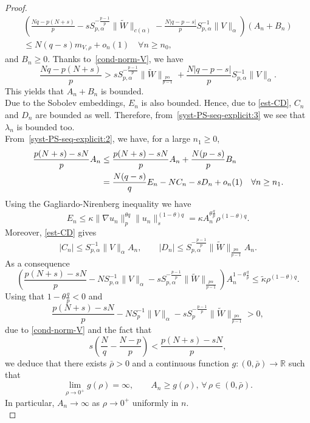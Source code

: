\documentclass[11pt,reqno]{amsart}
\theoremstyle{definition}
\numberwithin{equation}{section}
\numberwithin{theorem}{section}
\numberwithin{equation}{section}
\numberwithin{theorem}{section}
\newcommand{\R}{\mathbb{R}}
\begin{document}
\begin{proof}
\begin{align*}
    \left(\frac{Nq-p(N+s)}{p} -sS_{p,\alpha}^{-\frac{p-1}{p}}\|\tilde{W}\|_{c(\alpha)} 
    - \frac{N|q-p-s|}{p} S_{p,\alpha}^{-1}\|V\|_{\alpha} 
    \right)(A_n+B_n)\\
    \le 
      N(q-s)m_{V,\rho}+o_n(1)\quad\forall n\ge n_0,
\end{align*}
and $B_n\ge 0$.
Thanks to~\eqref{cond-norm-V}, we have
\[
\frac{Nq-p(N+s)}{p} > sS_{p,\alpha}^{-\frac{p-1}{p}}\|\tilde{W}\|_{\frac{p\alpha}{p-1}} 
    + \frac{N|q-p-s|}{p} S_{p,\alpha}^{-1}\|V\|_{\alpha}.
\]
This yields that $A_n+B_n$ is bounded.\\
Due to the Sobolev embeddings, $E_n$ is also bounded. Hence, due to \eqref{est-CD}, $C_n$ and $D_n$ are bounded as well. 
Therefore, from~\eqref{syst-PS-seq-explicit:3} we see that $\lambda_n$ is bounded too.\\

From~\eqref{syst-PS-seq-explicit:2}, we have, for a large $n_1\ge 0$,
\begin{equation}\notag
\begin{aligned}
\frac{p(N+s)-sN}{p}A_n
&\le\frac{p(N+s)-sN}{p}A_n+\frac{N(p-s)}{p}B_n\\
&=\frac{N(q-s)}{q}E_n-NC_n-sD_n+o_n(1)\quad\forall n\ge n_1.
\end{aligned}    
\end{equation}
Using the Gagliardo-Nirenberg inequality we have
$$E_n\le \kappa\|\nabla u_n\|_p^{\theta q}\|u_n\|_s^{(1-\theta)q}=\kappa A_n^{\theta\frac{q}{p}}\rho^{(1-\theta)q}.$$
Moreover, \eqref{est-CD} gives
$$|C_n|\le S_{p,\alpha}^{-1}\|V\|_{\alpha}A_n,\qquad |D_n|\le S_{p,\alpha}^{-\frac{p-1}{p}}\|\tilde{W}\|_{\frac{p\alpha}{p-1}}A_n.$$
As a consequence
$$\left(\frac{p(N+s)-sN}{p}-NS_{p,\alpha}^{-1}\|V\|_{\alpha}-sS_{p,\alpha}^{-\frac{p-1}{p}}\|\tilde{W}\|_{\frac{p\alpha}{p-1}}\right)A_n^{1-\theta\frac{q}{p}}
\le\tilde{\kappa}\rho^{(1-\theta)q}.$$
Using that $1-\theta\frac{q}{p}<0$ and
\begin{equation}
\label{extra-cond-V1}
\frac{p(N+s)-sN}{p}-N S_p^{-1}\|V\|_{\alpha}-s S_p^{-\frac{p-1}{p}}\|\tilde{W}\|_{\frac{p\alpha}{p-1}}>0,
\end{equation}
due to \eqref{cond-norm-V} and the fact that
$$s\left(\frac{N}{q}-\frac{N-p}{p}\right)<\frac{p(N+s)-sN}{p},$$
we deduce that there exists $\bar{\rho}>0$ and a continuous function $g:(0,\bar{\rho})\to\R$ such that 
\begin{equation}\label{A-n-bd-below}
\lim_{\rho\to 0^+}g(\rho)=\infty,\qquad A_n\ge g(\rho),\,\forall\,\rho\in(0,\bar{\rho}).
\end{equation}
In particular, $A_n\to\infty$ as $\rho\to 0^+$ uniformly in $n$.\\


\end{proof}
\end{document}
